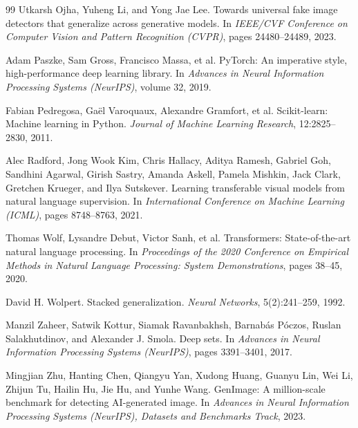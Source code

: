 \documentclass[10pt,a4paper]{article}
\begin{document}
\begin{thebibliography}{99}
Utkarsh Ojha, Yuheng Li, and Yong Jae Lee.
Towards universal fake image detectors that generalize across generative models.
In \emph{IEEE/CVF Conference on Computer Vision and Pattern Recognition (CVPR)}, pages 24480--24489, 2023.

Adam Paszke, Sam Gross, Francisco Massa, et al.
PyTorch: An imperative style, high-performance deep learning library.
In \emph{Advances in Neural Information Processing Systems (NeurIPS)}, volume 32, 2019.

Fabian Pedregosa, Ga{\"e}l Varoquaux, Alexandre Gramfort, et al.
Scikit-learn: Machine learning in Python.
\emph{Journal of Machine Learning Research}, 12:2825--2830, 2011.

Alec Radford, Jong Wook Kim, Chris Hallacy, Aditya Ramesh, Gabriel Goh, Sandhini Agarwal, Girish Sastry, Amanda Askell, Pamela Mishkin, Jack Clark, Gretchen Krueger, and Ilya Sutskever.
Learning transferable visual models from natural language supervision.
In \emph{International Conference on Machine Learning (ICML)}, pages 8748--8763, 2021.

Thomas Wolf, Lysandre Debut, Victor Sanh, et al.
Transformers: State-of-the-art natural language processing.
In \emph{Proceedings of the 2020 Conference on Empirical Methods in Natural Language Processing: System Demonstrations}, pages 38--45, 2020.

David H. Wolpert.
Stacked generalization.
\emph{Neural Networks}, 5(2):241--259, 1992.

Manzil Zaheer, Satwik Kottur, Siamak Ravanbakhsh, Barnab{\'a}s P{\'o}czos, Ruslan Salakhutdinov, and Alexander J. Smola.
Deep sets.
In \emph{Advances in Neural Information Processing Systems (NeurIPS)}, pages 3391--3401, 2017.

Mingjian Zhu, Hanting Chen, Qiangyu Yan, Xudong Huang, Guanyu Lin, Wei Li, Zhijun Tu, Hailin Hu, Jie Hu, and Yunhe Wang.
GenImage: A million-scale benchmark for detecting AI-generated image.
In \emph{Advances in Neural Information Processing Systems (NeurIPS), Datasets and Benchmarks Track}, 2023.

\end{thebibliography}

\clearpage
\appendix
{}
\end{document}

